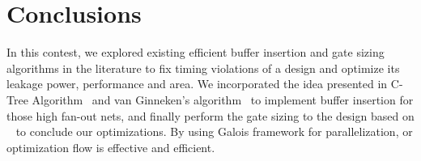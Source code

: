 \section{Conclusions}
In this contest, we explored existing efficient buffer insertion and gate sizing algorithms in the literature to fix timing violations of a design and optimize its leakage power, performance and area. We incorporated the idea presented in C-Tree Algorithm~\cite{Alpert:Buffered} and van Ginneken's algorithm~\cite{Lukas:Buffer} to implement buffer insertion for those high fan-out nets, and finally perform the gate sizing to the design based on ~\cite{Held:Gate} to conclude our optimizations. By using Galois framework for parallelization, or optimization flow is effective and efficient. 